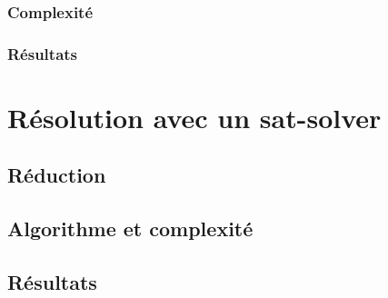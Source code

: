 \documentclass[a4paper,10pt]{article}
\begin{document}
\subsubsection{Complexité}

\subsubsection{Résultats}


\section{Résolution avec un sat-solver}


\subsection{Réduction}

\subsection{Algorithme et complexité}


\subsection{Résultats}
\end{document}

